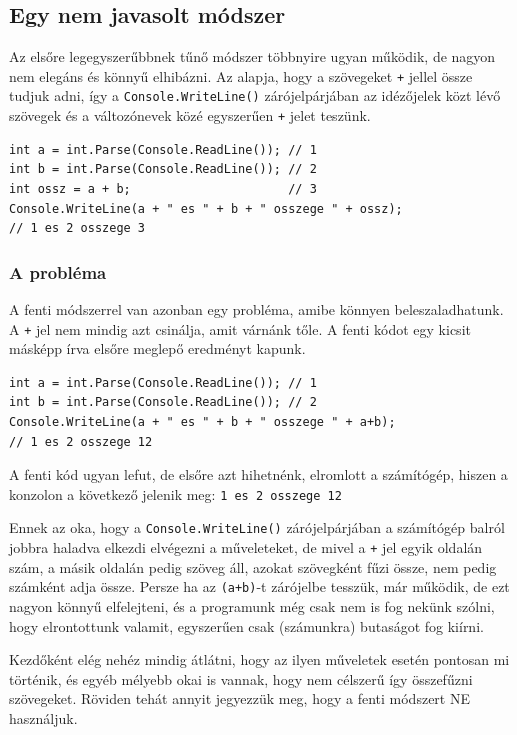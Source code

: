 \documentclass[a4paper]{article}
\begin{document}
\subsection{Egy nem javasolt módszer}
Az elsőre legegyszerűbbnek tűnő módszer többnyire ugyan működik, de nagyon nem elegáns és könnyű elhibázni. Az alapja, hogy a szövegeket \lstinline{+} jellel össze tudjuk adni, így a \lstinline{Console.WriteLine()} zárójelpárjában az idézőjelek közt lévő szövegek és a változónevek közé egyszerűen \lstinline{+} jelet teszünk.

\begin{lstlisting}[caption=Változók értékének kiírása -- nem elegánsan, label=lst:writeVarsNotElegant]
int a = int.Parse(Console.ReadLine()); // 1
int b = int.Parse(Console.ReadLine()); // 2
int ossz = a + b;                      // 3
Console.WriteLine(a + " es " + b + " osszege " + ossz);
// 1 es 2 osszege 3
\end{lstlisting}

\subsubsection{A probléma}
A fenti módszerrel van azonban egy probléma, amibe könnyen beleszaladhatunk. A \lstinline{+} jel nem mindig azt csinálja, amit várnánk tőle. A fenti kódot egy kicsit másképp írva elsőre meglepő eredményt kapunk.

\begin{lstlisting}[caption=Változók értékének kiírása -- hibásan, label=lst:writeVarsError]
int a = int.Parse(Console.ReadLine()); // 1
int b = int.Parse(Console.ReadLine()); // 2
Console.WriteLine(a + " es " + b + " osszege " + a+b);
// 1 es 2 osszege 12
\end{lstlisting}

A fenti kód ugyan lefut, de elsőre azt hihetnénk, elromlott a számítógép, hiszen a konzolon a következő jelenik meg: \lstinline{1 es 2 osszege 12}

Ennek az oka, hogy a \lstinline{Console.WriteLine()} zárójelpárjában a számítógép balról jobbra haladva elkezdi elvégezni a műveleteket, de mivel a \lstinline{+} jel egyik oldalán szám, a másik oldalán pedig szöveg áll, azokat szövegként fűzi össze, nem pedig számként adja össze. Persze ha az \lstinline{(a+b)}-t zárójelbe tesszük, már működik, de ezt nagyon könnyű elfelejteni, és a programunk még csak nem is fog nekünk szólni, hogy elrontottunk valamit, egyszerűen csak (számunkra) butaságot fog kiírni.

Kezdőként elég nehéz mindig átlátni, hogy az ilyen műveletek esetén pontosan mi történik, és egyéb mélyebb okai is vannak, hogy nem célszerű így összefűzni szövegeket. Röviden tehát annyit jegyezzük meg, hogy a fenti módszert NE használjuk.
\end{document}
